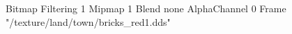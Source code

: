 {Bitmap
	{Filtering 1}
	{Mipmap 1}
	{Blend none}
	{AlphaChannel 0}
	{Frame "/texture/land/town/bricks_red1.dds"}
}
